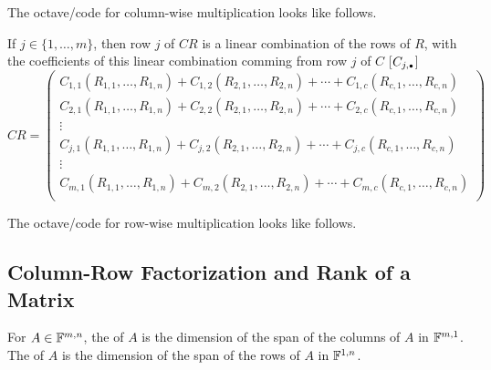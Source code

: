 \begin{thm}
\begin{minipage}{\linewidth}
  The octave\-/code for column-wise multiplication looks like follows.

\end{minipage}

   If $j\in \{1, \ldots, m\}$, then row $j$ of $CR$ is a linear combination of the rows of $R$, with the coefficients of this linear combination comming from row $j$ of $C$ [$C_{j,\mathsmaller{\bullet}}$]
  \begin{equation}
    CR =
    \left(
      \begin{matrix}
        C_{1,1} (R_{1,1}, \ldots, R_{1,n}) + C_{1,2} (R_{2,1}, \ldots, R_{2,n}) + \cdots + C_{1,c} (R_{c,1}, \ldots, R_{c,n}) \\
        C_{2,1} (R_{1,1}, \ldots, R_{1,n}) + C_{2,2} (R_{2,1}, \ldots, R_{2,n}) + \cdots + C_{2,c} (R_{c,1}, \ldots, R_{c,n}) \\
        \vdots \\
        C_{j,1} (R_{1,1}, \ldots, R_{1,n}) + C_{j,2} (R_{2,1}, \ldots, R_{2,n}) + \cdots + C_{j,c} (R_{c,1}, \ldots, R_{c,n}) \\
        \vdots \\
        C_{m,1} (R_{1,1}, \ldots, R_{1,n}) + C_{m,2} (R_{2,1}, \ldots, R_{2,n}) + \cdots + C_{m,c} (R_{c,1}, \ldots, R_{c,n}) \\
      \end{matrix}
    \right)
  \end{equation}

  \begin{minipage}{\linewidth}
    The octave\-/code for row-wise multiplication looks like follows.

  \end{minipage}

\end{thm}

\subsection{Column-Row Factorization and Rank of a Matrix}

\setcounter{thm}{51}
\begin{mydef}
  For $A \in \mathbb{F}^{m,n}$, the  of $A$ is the dimension of the span of the columns of $A$ in $\mathbb{F}^{m,1}$. The  of $A$ is the dimension of the span of the rows of $A$ in $\mathbb{F}^{1,n}$.
\end{mydef}

